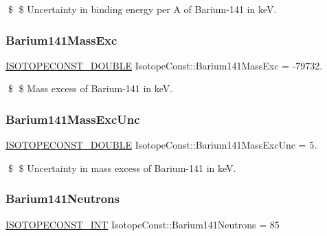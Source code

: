 \$ \$ Uncertainty in binding energy per A of Barium-\/141 in keV. \mbox{\label{group___isotope_const-_barium-_ba141_gaac197a28e3867b6281efe190dd20c954}} 
\subsubsection{\texorpdfstring{Barium141\+Mass\+Exc}{Barium141MassExc}}
{\footnotesize\ttfamily \mbox{\hyperlink{group___isotope_const-_macros_ga8f45a7272ce02c0b4c65c44636ed719a}{I\+S\+O\+T\+O\+P\+E\+C\+O\+N\+S\+T\+\_\+\+D\+O\+U\+B\+LE}} Isotope\+Const\+::\+Barium141\+Mass\+Exc = -\/79732.}

\$ \$ Mass excess of Barium-\/141 in keV. \mbox{\label{group___isotope_const-_barium-_ba141_gad347d3b566fbc836798cc3c66199dad6}} 
\subsubsection{\texorpdfstring{Barium141\+Mass\+Exc\+Unc}{Barium141MassExcUnc}}
{\footnotesize\ttfamily \mbox{\hyperlink{group___isotope_const-_macros_ga8f45a7272ce02c0b4c65c44636ed719a}{I\+S\+O\+T\+O\+P\+E\+C\+O\+N\+S\+T\+\_\+\+D\+O\+U\+B\+LE}} Isotope\+Const\+::\+Barium141\+Mass\+Exc\+Unc = 5.}

\$ \$ Uncertainty in mass excess of Barium-\/141 in keV. \mbox{\label{group___isotope_const-_barium-_ba141_ga57ba9f1369284d2c83eb65658d34f4f2}} 
\subsubsection{\texorpdfstring{Barium141\+Neutrons}{Barium141Neutrons}}
{\footnotesize\ttfamily \mbox{\hyperlink{group___isotope_const-_macros_ga5f18360b3e99483a35c32d789e62621c}{I\+S\+O\+T\+O\+P\+E\+C\+O\+N\+S\+T\+\_\+\+I\+NT}} Isotope\+Const\+::\+Barium141\+Neutrons = 85}

